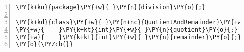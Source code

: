 \begin{Verbatim}[commandchars=\\\{\},numbers=left,firstnumber=1,stepnumber=1,frame=single,fontsize=\small]
\PY{k+kn}{package}\PY{+w}{ }\PY{n}{division}\PY{o}{;}

\PY{k+kd}{class}\PY{+w}{ }\PY{n+nc}{QuotientAndRemainder}\PY{+w}{ }\PY{o}{\PYZob{}}
\PY{+w}{    }\PY{k+kt}{int}\PY{+w}{ }\PY{n}{quotient}\PY{o}{;}
\PY{+w}{    }\PY{k+kt}{int}\PY{+w}{ }\PY{n}{remainder}\PY{o}{;}
\PY{o}{\PYZcb{}}
\end{Verbatim}
